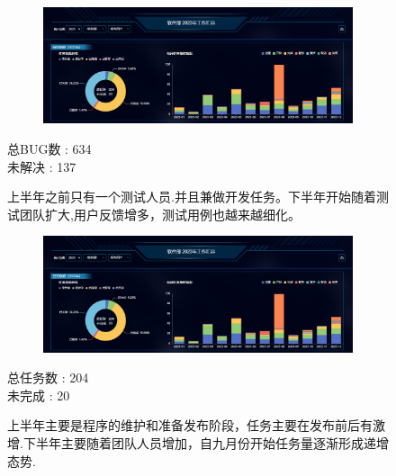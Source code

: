 \documentclass[AutoFakeBold,AutoFakeSlant]{beamer}
\begin{document}
	\begin{frame}[fragile]
		\begin{figure}
			\centering %
			\begin{subfigure}{\linewidth}
				\includegraphics[width=\linewidth]{Task}
			\end{subfigure}
			
			\begin{minipage}[l]{0.3\linewidth}
				\large
				总BUG数 : 634 \\
				未解决  : 137
			\end{minipage}\hfill
			\begin{minipage}[l]{0.6\linewidth}
			\footnotesize
			上半年之前只有一个测试人员.并且兼做开发任务。下半年开始随着测试团队扩大,用户反馈增多，测试用例也越来越细化。
			\end{minipage}
		\end{figure} 
	\end{frame}
	
	\begin{frame}[fragile]
		\begin{figure}
			\centering %
			\begin{subfigure}{\linewidth}
				\includegraphics[width=\linewidth]{Task}
			\end{subfigure} 
			
			\begin{minipage}[l]{0.3\linewidth}
				\large
				总任务数 : 204 \\
				未完成  : 20
			\end{minipage}\hfill
			\begin{minipage}[l]{0.6\linewidth}
				\footnotesize
				上半年主要是程序的维护和准备发布阶段，任务主要在发布前后有激增.下半年主要随着团队人员增加，自九月份开始任务量逐渐形成递增态势.
			\end{minipage}
		\end{figure}
	\end{frame}
	
\end{document}
